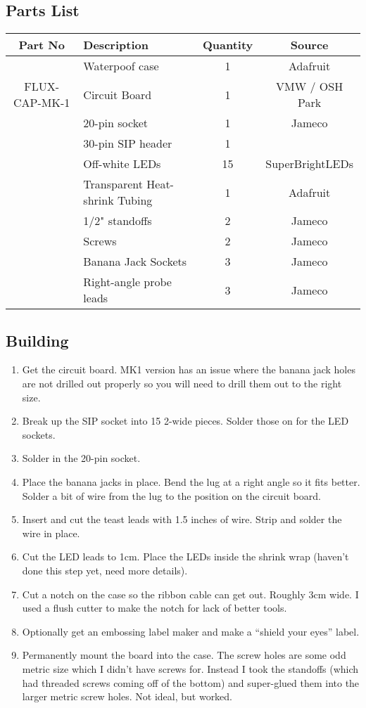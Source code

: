 \documentclass[11pt]{article}
\begin{document}
\subsection{Parts List}

\begin{tabular}{|c|l|c|c|}
\hline
Part No	&  Description			&  Quantity	& Source \\
\hline
\hline
	& Waterpoof case		& 1		& Adafruit \\
\hline
FLUX-CAP-MK-1	& Circuit Board		& 1		& VMW / OSH Park \\
\hline
	& 20-pin socket			& 1		& Jameco \\
\hline
	& 30-pin SIP header		& 1		&	\\
\hline
	& Off-white LEDs		& 15		& SuperBrightLEDs \\
\hline
	& Transparent Heat-shrink Tubing &	1	& Adafruit \\
\hline
	& 1/2" standoffs		& 2		& Jameco\\
\hline
	& Screws			& 2		& Jameco\\
\hline
	& Banana Jack Sockets		& 3		& Jameco \\
\hline
	& Right-angle probe leads	& 3		& Jameco \\
\hline
\hline
\end{tabular}

\subsection{Building}

\begin{enumerate}

\item Get the circuit board.  MK1 version has an issue where the
	banana jack holes are not drilled out properly so you will
	need to drill them out to the right size.
\item Break up the SIP socket into 15 2-wide pieces.
	Solder those on for the LED sockets.
\item Solder in the 20-pin socket.
\item Place the banana jacks in place.  
	Bend the lug at a right angle so it fits better.
	Solder a bit of wire from the lug to the position on the
	circuit board.
\item Insert and cut the teast leads with 1.5 inches of wire.  Strip
	and solder the wire in place.
\item 	Cut the LED leads to 1cm.
	Place the LEDs inside the shrink wrap (haven't done this step
	yet, need more details).
\item Cut a notch on the case so the ribbon cable can get out.
	Roughly 3cm wide.  I used a flush cutter to make the notch
	for lack of better tools.
\item Optionally get an embossing label maker and make a 
	``shield your eyes'' label.
\item Permanently mount the board into the case.  The screw holes
	are some odd metric size which I didn't have screws for.
	Instead I took the standoffs (which had threaded screws coming
	off of the bottom) and super-glued them into the larger metric
	screw holes.  
	Not ideal, but worked.
\end{enumerate}
\end{document}
